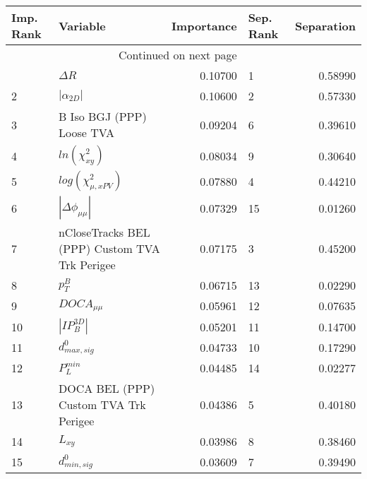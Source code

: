 \usepackage{lscape}

\begin{landscape}
\begin{longtable}{llrlr}
\toprule
Imp. Rank &                                       Variable &  Importance & Sep. Rank &  Separation \\
\midrule
\endhead
\midrule
\multicolumn{3}{r}{{Continued on next page}} \\
\midrule
\endfoot

\bottomrule
\endlastfoot
        1 &                                     $\Delta R$ &     0.10700 &         1 &     0.58990 \\
        2 &                                $|\alpha_{2D}|$ &     0.10600 &         2 &     0.57330 \\
        3 &                      B Iso BGJ (PPP) Loose TVA &     0.09204 &         6 &     0.39610 \\
        4 &                            $ln(\chi^{2}_{xy})$ &     0.08034 &         9 &     0.30640 \\
        5 &                      $log(\chi^{2}_{\mu,xPV})$ &     0.07880 &         4 &     0.44210 \\
        6 &                       $|\Delta \phi_{\mu\mu}|$ &     0.07329 &        15 &     0.01260 \\
        7 &  nCloseTracks BEL (PPP) Custom TVA Trk Perigee &     0.07175 &         3 &     0.45200 \\
        8 &                                      $p^B_{T}$ &     0.06715 &        13 &     0.02290 \\
        9 &                                $DOCA_{\mu\mu}$ &     0.05961 &        12 &     0.07635 \\
       10 &                                $|IP_{B}^{3D}|$ &     0.05201 &        11 &     0.14700 \\
       11 &                               $d^0_{max, sig}$ &     0.04733 &        10 &     0.17290 \\
       12 &                                  $P^{min}_{L}$ &     0.04485 &        14 &     0.02277 \\
       13 &          DOCA BEL (PPP) Custom TVA Trk Perigee &     0.04386 &         5 &     0.40180 \\
       14 &                                       $L_{xy}$ &     0.03986 &         8 &     0.38460 \\
       15 &                               $d^0_{min, sig}$ &     0.03609 &         7 &     0.39490 \\
\end{longtable}

\end{landscape}
